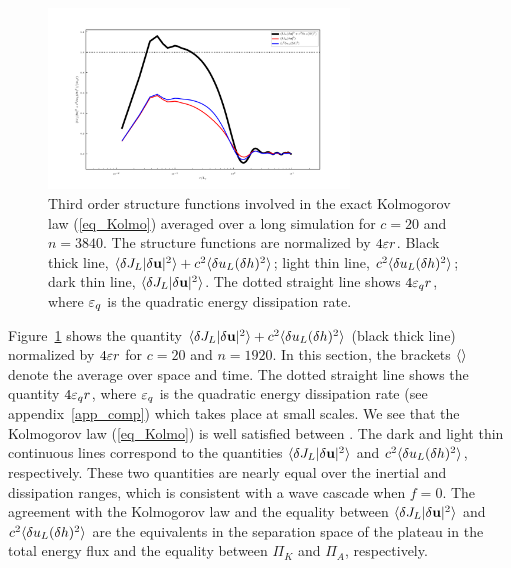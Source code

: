 \begin{figure}
\centerline{\includegraphics[width=3.15in]{../Pyfig/fig_Kolmo_c=20_N=3840}}
\caption{
Third order structure functions involved in the exact Kolmogorov law (\ref{eq_Kolmo})
averaged over a long simulation for $c = 20$ and $n = 3840$.
%
The structure functions are normalized by $4 \varepsilon r$.
%
Black thick line, $\langle  \delta J_L|\delta \textbf{u}|^2  \rangle
+ c^2\langle \delta u_L(\delta h)^2 \rangle$;
light thin line, $c^2\langle \delta u_L (\delta h)^2 \rangle$;
dark thin line, $\langle \delta J_L |\delta \textbf{u}|^2 \rangle$.
%
The dotted straight line shows $4 \varepsilon_q r$,
where $\varepsilon_q$ is the quadratic energy dissipation rate.
}
\label{fig_Kolmo}
\end{figure}


Figure~\ref{fig_Kolmo} shows the quantity $\langle \delta J_L|\delta
\textbf{u}|^2  \rangle + c^2\langle \delta u_L(\delta h)^2  \rangle$ (black thick line)
normalized by $4 \varepsilon r$ for $c = 20$ and $n = 1920$.
%
In this section, the brackets $\langle  \rangle$ denote the average over space
and time.
%
The dotted straight line shows the quantity $4 \varepsilon_q r$, where
$\varepsilon_q$ is the quadratic energy dissipation rate (see
appendix~\ref{app_comp}) which takes place at small scales.
%
We see that the Kolmogorov law (\ref{eq_Kolmo}) is well satisfied
between .  The dark and
light thin continuous lines correspond to the quantities $\langle \delta
J_L|\delta \textbf{u}|^2  \rangle$ and $c^2\langle \delta u_L(\delta h)^2 \rangle$,
respectively.
%
These two quantities are nearly equal over the inertial and
dissipation ranges, which is consistent with a wave cascade when
$f=0$.
%
The agreement with the Kolmogorov law and the equality between
$\langle \delta J_L|\delta \textbf{u}|^2  \rangle$ and $c^2\langle \delta u_L(\delta
h)^2 \rangle$ are the equivalents in the separation space of the plateau in
the total energy flux and the equality between $\Pi_K$ and $\Pi_A$,
respectively.




